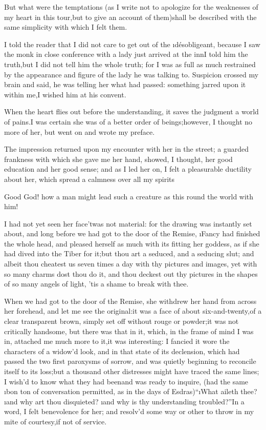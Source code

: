 \documentclass[twoside]{article}
\begin{document}
\tsk But what were the temptations (as I write not to apologize for the
weaknesses of my heart in this tour,\tsk but to give an account of
them)\tsk shall be described with the same simplicity with which I felt them.






 I told the reader that I did not care to get out of the
\i{désobligeant}, because I saw the monk in close conference with a lady
just arrived at the inn\tsk I told him the truth,\tsk but I did not tell him the
whole truth; for I was as full as much restrained by the appearance and
figure of the lady he was talking to.  Suspicion crossed my brain and
said, he was telling her what had passed: something jarred upon it within
me,\tsk I wished him at his convent.

When the heart flies out before the understanding, it saves the judgment
a world of pains.\tsk I was certain she was of a better order of
beings;\tsk however, I thought no more of her, but went on and wrote my
preface.

The impression returned upon my encounter with her in the street; a
guarded frankness with which she gave me her hand, showed, I thought, her
good education and her good sense; and as I led her on, I felt a
pleasurable ductility about her, which spread a calmness over all my
spirits\tsk 

\tsk Good God! how a man might lead such a creature as this round the world
with him!\tsk 

I had not yet seen her face\tsk ’twas not material: for the drawing was
instantly set about, and long before we had got to the door of the
Remise, \i{Fancy} had finished the whole head, and pleased herself as much
with its fitting her goddess, as if she had dived into the Tiber for
it;\tsk but thou art a seduced, and a seducing slut; and albeit thou cheatest
us seven times a day with thy pictures and images, yet with so many
charms dost thou do it, and thou deckest out thy pictures in the shapes
of so many angels of light, ’tis a shame to break with thee.

When we had got to the door of the Remise, she withdrew her hand from
across her forehead, and let me see the original:\tsk it was a face of about
six-and-twenty,\tsk of a clear transparent brown, simply set off without
rouge or powder;\tsk it was not critically handsome, but there was that in
it, which, in the frame of mind I was in, attached me much more to it,\tsk it
was interesting: I fancied it wore the characters of a widow’d look, and
in that state of its declension, which had passed the two first paroxysms
of sorrow, and was quietly beginning to reconcile itself to its loss;\tsk but
a thousand other distresses might have traced the same lines; I wish’d to
know what they had been\tsk and was ready to inquire, (had the same \i{bon ton}
of conversation permitted, as in the days of Esdras)\tsk “\i{What aileth thee}?
\i{and why art thou disquieted}? \i{and why is thy understanding
troubled}?”\tsk In a word, I felt benevolence for her; and resolv’d some way
or other to throw in my mite of courtesy,\tsk if not of service.
\end{document}
